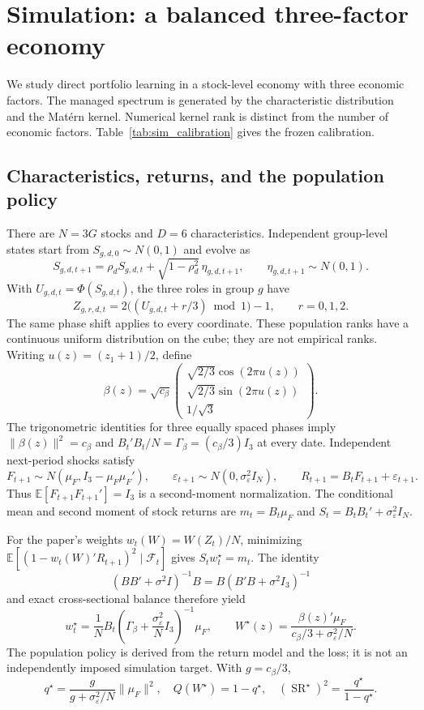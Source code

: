 
\section{Simulation: a balanced three-factor economy}
\label{sec:balanced_simulation}
We study direct portfolio learning in a stock-level economy with three economic
factors. The managed spectrum is generated by the characteristic distribution
and the Mat\'ern kernel. Numerical kernel rank is distinct from the number of
economic factors. Table~\ref{tab:sim_calibration} gives the frozen calibration.

\subsection{Characteristics, returns, and the population policy}
There are $N=3G$ stocks and $D=6$ characteristics. Independent group-level states
start from $S_{g,d,0}\sim N(0,1)$ and evolve as
\[
S_{g,d,t+1}=\rho_d S_{g,d,t}+\sqrt{1-\rho_d^2}\,\eta_{g,d,t+1},
\qquad \eta_{g,d,t+1}\sim N(0,1).
\]
With $U_{g,d,t}=\Phi(S_{g,d,t})$, the three roles in group $g$ have
\[
Z_{g,r,d,t}=2\bigl((U_{g,d,t}+r/3)\bmod 1\bigr)-1,
\qquad r=0,1,2.
\]
The same phase shift applies to every coordinate. These population ranks have a
continuous uniform distribution on the cube; they are not empirical ranks.
Writing $u(z)=(z_1+1)/2$, define
\[
\beta(z)=\sqrt{c_\beta}
\begin{pmatrix}
\sqrt{2/3}\cos(2\pi u(z))\\
\sqrt{2/3}\sin(2\pi u(z))\\
1/\sqrt 3
\end{pmatrix}.
\]
The trigonometric identities for three equally spaced phases imply
$\|\beta(z)\|^2=c_\beta$ and
$B_t'B_t/N=\Gamma_\beta=(c_\beta/3)I_3$ at every date.
Independent next-period shocks satisfy
\[
F_{t+1}\sim N(\mu_F,I_3-\mu_F\mu_F'),\qquad
\varepsilon_{t+1}\sim N(0,\sigma_\varepsilon^2 I_N),\qquad
R_{t+1}=B_tF_{t+1}+\varepsilon_{t+1}.
\]
Thus $\mathbb E[F_{t+1}F_{t+1}']=I_3$ is a second-moment normalization.
The conditional mean and second moment of stock returns are
$m_t=B_t\mu_F$ and $S_t=B_tB_t'+\sigma_\varepsilon^2I_N$.

For the paper's weights $w_t(W)=W(Z_t)/N$, minimizing
$\mathbb E[(1-w_t(W)'R_{t+1})^2\mid\mathcal F_t]$
gives $S_tw_t^\star=m_t$. The identity
\[
(BB'+\sigma^2 I)^{-1}B=B(B'B+\sigma^2 I_3)^{-1}
\]
and exact cross-sectional balance therefore yield
\[
w_t^\star=\frac1N B_t
\left(\Gamma_\beta+\frac{\sigma_\varepsilon^2}{N}I_3\right)^{-1}\mu_F,
\qquad
W^\star(z)=\frac{\beta(z)'\mu_F}{c_\beta/3+\sigma_\varepsilon^2/N}.
\]
The population policy is derived from the return model and the loss; it is not
an independently imposed simulation target. With $g=c_\beta/3$,
\[
q^\star=\frac{g}{g+\sigma_\varepsilon^2/N}\|\mu_F\|^2,\quad
Q(W^\star)=1-q^\star,\quad
(\operatorname{SR}^\star)^2=\frac{q^\star}{1-q^\star}.
\]

